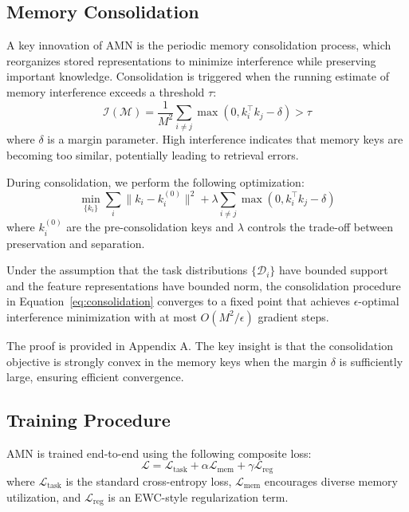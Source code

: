 \documentclass[11pt]{article}
\begin{document}
\subsection{Memory Consolidation}
\label{sec:consolidation}

A key innovation of AMN is the periodic memory consolidation process, which reorganizes stored representations to minimize interference while preserving important knowledge. Consolidation is triggered when the running estimate of memory interference exceeds a threshold $\tau$:
\begin{equation}
    \mathcal{I}(\mathcal{M}) = \frac{1}{M^2} \sum_{i \neq j} \max(0, k_i^\top k_j - \delta) > \tau
\end{equation}
where $\delta$ is a margin parameter. High interference indicates that memory keys are becoming too similar, potentially leading to retrieval errors.

During consolidation, we perform the following optimization:
\begin{equation}
    \min_{\{k_i\}} \sum_{i} \|k_i - k_i^{(0)}\|^2 + \lambda \sum_{i \neq j} \max(0, k_i^\top k_j - \delta)
    \label{eq:consolidation}
\end{equation}
where $k_i^{(0)}$ are the pre-consolidation keys and $\lambda$ controls the trade-off between preservation and separation.

\begin{theorem}
\label{thm:convergence}
Under the assumption that the task distributions $\{\mathcal{D}_i\}$ have bounded support and the feature representations have bounded norm, the consolidation procedure in Equation~\ref{eq:consolidation} converges to a fixed point that achieves $\epsilon$-optimal interference minimization with at most $O(M^2 / \epsilon)$ gradient steps.
\end{theorem}

The proof is provided in Appendix A. The key insight is that the consolidation objective is strongly convex in the memory keys when the margin $\delta$ is sufficiently large, ensuring efficient convergence.

\subsection{Training Procedure}

AMN is trained end-to-end using the following composite loss:
\begin{equation}
    \mathcal{L} = \mathcal{L}_{\text{task}} + \alpha \mathcal{L}_{\text{mem}} + \gamma \mathcal{L}_{\text{reg}}
\end{equation}
where $\mathcal{L}_{\text{task}}$ is the standard cross-entropy loss, $\mathcal{L}_{\text{mem}}$ encourages diverse memory utilization, and $\mathcal{L}_{\text{reg}}$ is an EWC-style regularization term.
\end{document}
